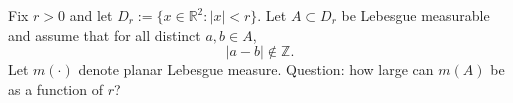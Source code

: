 Fix $r>0$ and let $D_r:=\{x\in\mathbb R^2:|x|<r\}$.
Let $A\subset D_r$ be Lebesgue measurable and assume that for all distinct $a,b\in A$,
\[
|a-b|\notin \mathbb Z.
\]
Let $m(\cdot)$ denote planar Lebesgue measure.
Question: how large can $m(A)$ be as a function of $r$?
